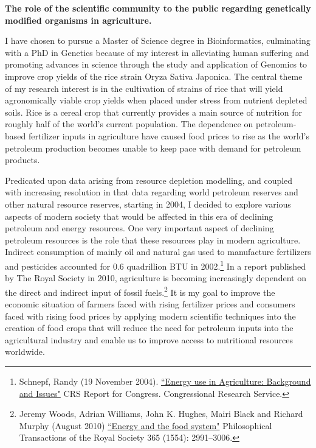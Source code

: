 \documentclass[letterpaper,10pt,twoside]{article}
\begin{document}
\begin{center}
\textbf{\large{The role of the scientific community to the public regarding genetically modified organisms in agriculture.}}
\end{center}
I have chosen to pursue a Master of Science degree in Bioinformatics, culminating with a PhD in Genetics because of my interest in alleviating human suffering and promoting advances in science through the study and application of Genomics to improve crop yields of the rice strain Oryza Sativa Japonica.  The central theme of my research interest is in the cultivation of strains of rice that will yield agronomically viable crop yields when placed under stress from nutrient depleted soils.  Rice is a cereal crop that currently provides a main source of nutrition for roughly half of the world's current population.  The dependence on petroleum-based fertilizer inputs in agriculture have caused food prices to rise as the world's petroleum production becomes unable to keep pace with demand for petroleum products.  

Predicated upon data arising from resource depletion modelling, and coupled with increasing resolution in that data regarding world petroleum reserves and other natural resource reserves, starting in 2004, I decided to explore various aspects of modern society that would be affected in this era of declining petroleum and energy resources.  One very important aspect of declining petroleum resources is the role that these resources play in modern agriculture.  Indirect consumption of mainly oil and natural gas used to manufacture fertilizers and pesticides accounted for 0.6 quadrillion BTU in 2002.\footnote{\label{Schnepf}Schnepf, Randy (19 November 2004). \href{http://www.nationalaglawcenter.org/wp-content/uploads/assets/crs/RL32677.pdf}{``Energy use in Agriculture: Background and Issues"} CRS Report for Congress. Congressional Research Service.}  In a report published by The Royal Society in 2010, agriculture is becoming increasingly dependent on the direct and indirect input of fossil fuels.\footnote{Jeremy Woods, Adrian Williams, John K. Hughes, Mairi Black and Richard Murphy (August 2010) \href{http://rstb.royalsocietypublishing.org/content/365/1554/2991.full}{``Energy and the food system"} Philosophical Transactions of the Royal Society 365 (1554): 2991–3006.}  It is my goal to improve the economic situation of farmers faced with rising fertilizer prices and consumers faced with rising food prices by applying modern scientific techniques into the creation of food crops that will reduce the need for petroleum inputs into the agricultural industry and enable us to improve access to nutritional resources worldwide.
\end{document}
